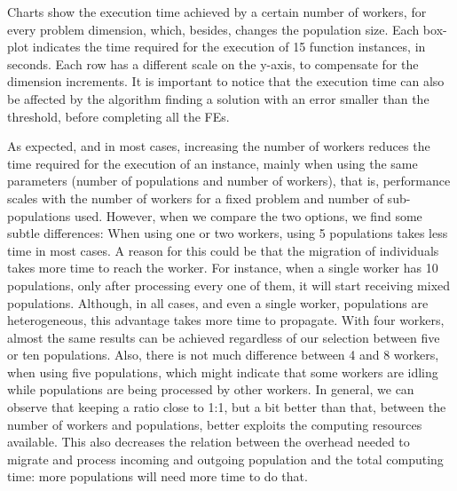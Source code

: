 \documentclass[review]{elsarticle}
\begin{document}
Charts show the execution time achieved by a certain number of
workers, for every problem dimension, which, besides, changes the
population size.
Each box-plot indicates the time required for the execution of 15 function
instances, in seconds.  Each row has a different scale on the y-axis, to
compensate for the dimension increments. It is important to notice that the
execution time can also be affected by the algorithm finding a solution with an
error smaller than the threshold, before completing all the FEs.

As expected, and in most cases, increasing the number of workers reduces the time
required for the execution of an instance, mainly when using the same parameters
(number of populations and number of workers), that is, performance
scales with the number of workers for a fixed problem and number of
sub-populations used. However, when we compare the two
options, we find some subtle differences: When using one or two
workers, using 5 populations takes less time in most cases. A 
reason for this could be that the migration of individuals takes more time to
reach the worker. For instance, when a single worker has 10 populations, only
after processing every one of them, it will start receiving mixed populations.  Although, in
all cases, and even a single worker, populations are heterogeneous, this
advantage takes more time to propagate. With four workers, almost the same
results can be achieved regardless of our selection between five or ten
populations. Also, there is not much difference between 4 and 8 workers, when
using five populations, which might indicate that some workers are
idling while populations are being processed by other workers. In
general, we can observe that keeping a ratio close to 1:1, but a bit
better than that, between the number of workers and populations, better exploits the computing
resources available. This also decreases the relation between the
overhead needed to migrate and process incoming and outgoing
population and the total computing time: more populations will need
more time to do that.
\end{document}
